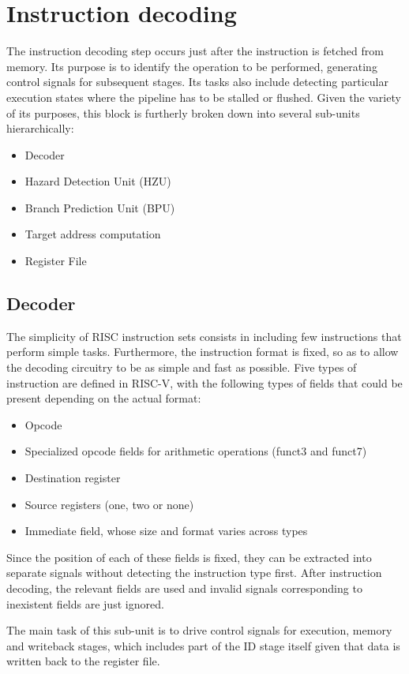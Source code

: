 \section{Instruction decoding}
The instruction decoding step occurs just after the instruction is fetched from memory. Its purpose is to identify the operation to be performed, generating control signals for subsequent stages. Its tasks also include detecting particular execution states where the pipeline has to be stalled or flushed.
Given the variety of its purposes, this block is furtherly broken down into several sub-units hierarchically:
\begin{itemize}
	\item Decoder
	\item Hazard Detection Unit (HZU)
	\item Branch Prediction Unit (BPU)
	\item Target address computation
	\item Register File
\end{itemize} 

\subsection{Decoder} 
The simplicity of RISC instruction sets consists in including few instructions that perform simple tasks. Furthermore, the instruction format is fixed, so as to allow the decoding circuitry to be as simple and fast as possible. Five types of instruction are defined in RISC-V, with the following types of fields that could be present depending on the actual format:
\begin{itemize}
	\item Opcode
	\item Specialized opcode fields for arithmetic operations (funct3 and funct7)
	\item Destination register
	\item Source registers (one, two or none)
	\item Immediate field, whose size and format varies across types
\end{itemize}
Since the position of each of these fields is fixed, they can be extracted into separate signals without detecting the instruction type first. After instruction decoding, the relevant fields are used and invalid signals corresponding to inexistent fields are just ignored.

The main task of this sub-unit is to drive control signals for execution, memory and writeback stages, which includes part of the ID stage itself given that data is written back to the register file.

